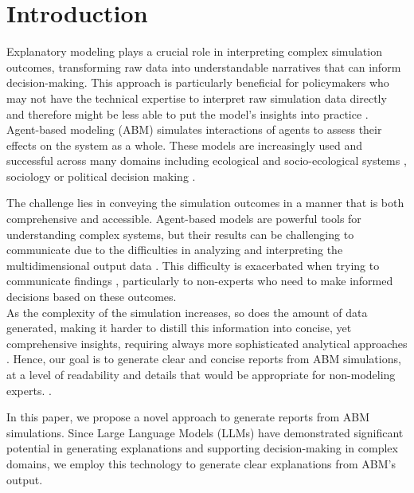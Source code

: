 \documentclass[preprint,12pt]{elsarticle}
\begin{document}

\section{Introduction}
\label{sec1}

Explanatory modeling plays a crucial role in interpreting complex simulation outcomes, transforming raw data into understandable narratives that can inform decision-making. This approach is particularly beneficial for policymakers who may not have the technical expertise to interpret raw simulation data directly and therefore might be less able to put the model's insights into practice \cite{Zellner2022}.\\

Agent-based modeling (ABM) simulates interactions of agents to assess their effects on the system as a whole. These models are increasingly used and successful across many domains including ecological and socio-ecological systems \cite{Achter2024} \cite{DeAngelis2019}, sociology \cite{Bianchi2015} or political decision making \cite{Qiu2020}.


 The challenge lies in conveying the simulation outcomes in a manner that is both comprehensive and accessible. Agent-based models are powerful tools for understanding complex systems, but their results can be challenging to communicate due to the difficulties in analyzing and interpreting the multidimensional output data \cite{Lee2015}. This difficulty is exacerbated when trying to communicate findings \cite{An2020}, particularly to non-experts who need to make informed decisions based on these outcomes.\cite{Papadopoulou2018}\\

As the complexity of the simulation increases, so does the amount of data generated, making it harder to distill this information into concise, yet comprehensive insights, requiring always more sophisticated analytical approaches \cite{Lee2015}. Hence, our goal is to generate clear and concise reports from ABM simulations, at a level of readability and details that would be appropriate for non-modeling experts. \cite{Sun2016}.

In this paper, we propose a novel approach to generate reports from ABM simulations. Since Large Language Models (LLMs) have demonstrated significant potential in generating explanations and supporting decision-making in complex domains, we employ this technology to generate clear explanations from ABM's output. \\
\end{document}
